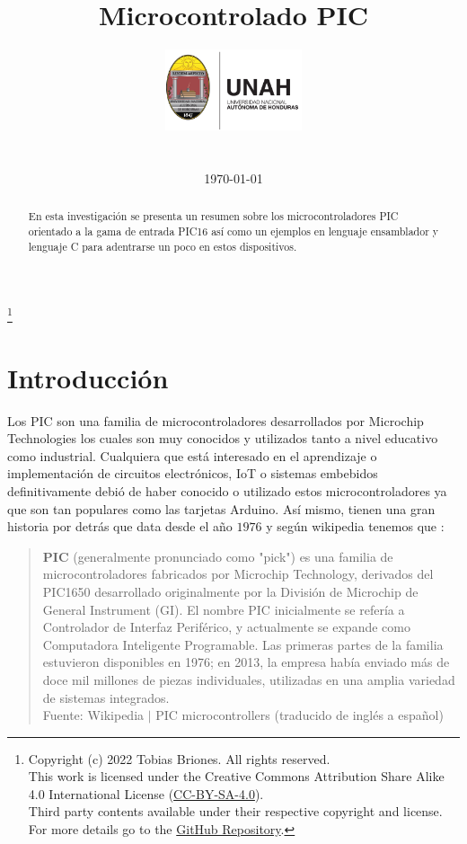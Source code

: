 \documentclass[conference]{IEEEtran}
\title{Microcontrolado PIC}
\author{
    \includegraphics[width = 40mm]{images/logo-unah}\\[8ex]
    \IEEEauthorblockN{Tobias Briones}
    \IEEEauthorblockN{tobias.briones@unah.hn}
    \IEEEauthorblockA{\textit{Universidad Nacional Autónoma de Honduras} \\
    \textit{Ingeniería de Sistemas} \\
    \textit{I PAC 2022} \\
    \textit{IS911-MICROPROCESADORES}} \\\vspace*{20pt} \normalsize  \\
    \today
}
\newcommand\blfootnote[1]{
    \begingroup
    \renewcommand\thefootnote{}\footnote{#1}
    \addtocounter{footnote}{-1}
    \endgroup
}
\begin{document}
    \maketitle

    \begin{abstract}
        En esta investigación se presenta un resumen sobre los
        microcontroladores PIC orientado a la gama de entrada PIC16 así como
        un ejemplos en lenguaje ensamblador y lenguaje C para adentrarse un
        poco en estos dispositivos.
    \end{abstract}

    \tableofcontents

    \blfootnote{
        Copyright (c) 2022 Tobias Briones. All rights reserved. \\
        This work is licensed under the Creative Commons Attribution Share
        Alike 4.0 International License (\href{https://spdx
.org/licenses/CC-BY-SA-4.0}{CC-BY-SA-4.0}). \\
        Third party contents available under their respective copyright and
        license.\\
        For more details go to the \href{https://github
.com/tobiasbriones/cp-unah-is911-microprocessors}{GitHub Repository}.}

    \section{Introducción}

    Los PIC son una familia de microcontroladores desarrollados por Microchip
    Technologies \cite{microchip-technology-inc-2013} los cuales son muy
    conocidos y utilizados tanto a nivel educativo como industrial.
    Cualquiera que está interesado en el aprendizaje o implementación de
    circuitos electrónicos, IoT o sistemas embebidos definitivamente debió de
    haber conocido o utilizado estos microcontroladores ya que son tan
    populares como las tarjetas Arduino. Así mismo, tienen una gran historia
    por detrás que data desde el año $1976$ y según wikipedia tenemos que
    \cite{wikipedia-pic-2022}:

    \bigbreak

    \begin{quote}
        \textbf{PIC} (generalmente pronunciado como "pick") es una familia de
        microcontroladores fabricados por Microchip Technology, derivados del
        PIC1650 desarrollado originalmente por la División de Microchip de
        General Instrument (GI). El nombre PIC inicialmente se refería a
        Controlador de Interfaz Periférico, y actualmente se expande como
        Computadora Inteligente Programable. Las primeras partes de la
        familia estuvieron disponibles en 1976; en 2013, la empresa había
        enviado más de doce mil millones de piezas individuales, utilizadas
        en una amplia variedad de sistemas integrados.
        \\
        \small Fuente: Wikipedia $\mid$ PIC microcontrollers (traducido de
        inglés a español) \cite{wikipedia-pic-2022}
    \end{quote}
\end{document}

